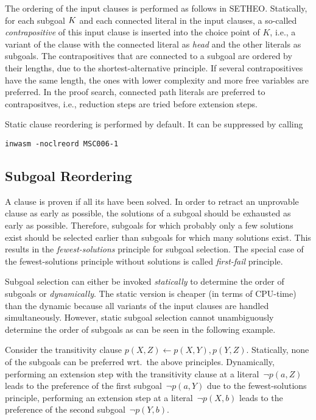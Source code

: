The ordering of the input clauses is performed as follows in
SE\-THEO. 
Statically, for each subgoal $K\/$ and each connected literal in the
input clauses, a so-called {\em contrapositive\/} of this input clause
is inserted into the choice point of $K$, i.e., a variant of the
clause with the connected literal as {\em head\/} and the other
literals as subgoals. 
The contrapositives that are connected to a subgoal are ordered by
their lengths, due to the shortest-alternative principle. 
If several contrapositives have the same length, the ones with lower
complexity and more free variables are preferred.  
In the proof search, connected path literals are preferred to
contrapositves, i.e., reduction steps are tried before extension
steps. 

Static clause reordering is performed by default. It can be suppressed
by calling
\begin{center}
\begin{verbatim}
inwasm -noclreord MSC006-1
\end{verbatim}
\end{center}

\subsection{Subgoal Reordering}

A clause is proven if all its have been solved.
In order to retract an unprovable clause as early as possible, the
solutions of a subgoal should be exhausted as early as possible.
Therefore, subgoals for which probably only a few solutions exist
should be selected earlier than subgoals for which many solutions
exist.
This results in the {\em fewest-solutions\/} principle for subgoal
selection. 
The special case of the fewest-solutions principle without solutions
is called {\em first-fail\/} principle. 

Subgoal selection can either be invoked {\em statically\/} to
determine the order of subgoals or {\em dynamically\/}. 
The static version is cheaper (in terms of CPU-time) than the dynamic
because all variants of the input clauses are handled simultaneously. 
However, static subgoal selection cannot unambiguously determine the
order of subgoals as can be seen in the following example.

Consider the transitivity clause $p(X,Z) \leftarrow p(X,Y), p(Y,Z)$.
Statically, none of the subgoals can be preferred wrt.\ the above
principles. 
Dynamically, performing an extension step with the
transitivity clause at a literal~$\neg p(a,Z)$ leads to the preference
of the first subgoal~$\neg p(a,Y)$ due to the fewest-solutions
principle, performing an extension step at a literal~$\neg p(X,b)$
leads to the preference of the second subgoal~$\neg p(Y,b)$. 

